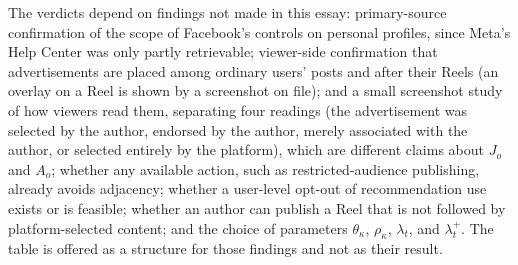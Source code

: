 The verdicts depend on findings not made in this essay: primary-source confirmation of the scope of Facebook's controls on personal profiles, since Meta's Help Center was only partly retrievable; viewer-side confirmation that advertisements are placed among ordinary users' posts and after their Reels (an overlay on a Reel is shown by a screenshot on file); and a small screenshot study of how viewers read them, separating four readings (the advertisement was selected by the author, endorsed by the author, merely associated with the author, or selected entirely by the platform), which are different claims about $J_o$ and $A_o$; whether any available action, such as restricted-audience publishing, already avoids adjacency; whether a user-level opt-out of recommendation use exists or is feasible; whether an author can publish a Reel that is not followed by platform-selected content; and the choice of parameters $\theta_\kappa$, $\rho_\kappa$, $\lambda_t$, and $\lambda^{+}_t$. The table is offered as a structure for those findings and not as their result.
